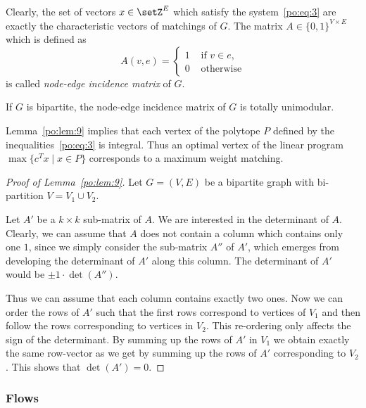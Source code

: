 Clearly, the set of vectors $x \in \setZ^E$ which satisfy the
system~\eqref{po:eq:3} are exactly the characteristic vectors of
matchings of $G$. The matrix $A \in \{0,1\}^{V\times E}$ which is defined as 
\begin{displaymath}
  \label{po:sec:bipartite-matching}
  A(v,e) = 
  \begin{cases}
    1 & \text{ if } v \in e,\\
    0 & \text{ otherwise}
  \end{cases}
\end{displaymath}
is called \emph{node-edge incidence matrix} of $G$. 

\begin{lemma}
  \label{po:lem:9}
  If $G$ is bipartite, the node-edge incidence matrix of $G$ is
  totally unimodular. 
\end{lemma}

Lemma~\ref{po:lem:9} implies that each vertex of the polytope $P$ defined
by the inequalities~\eqref{po:eq:3} is integral. Thus an optimal vertex
of the linear program $\max\{c^Tx \mid x \in P\}$ corresponds to a
maximum weight matching. 



\begin{proof}[Proof of Lemma~\ref{po:lem:9}]
  Let  $G = (V,E)$ be a bipartite graph with bi-partition $V=V_1\cup V_2$. 
  
  Let $A'$ be a $k\times k$ sub-matrix of $A$. We are interested in the
  determinant of $A$. Clearly, we can assume that $A$ does not contain
  a column which contains only one $1$, since we simply consider the
  sub-matrix $A''$ of $A'$, which emerges from developing the
  determinant of $A'$ along this column. The determinant of $A'$ would
  be $\pm1\cdot \det(A'')$.
  
  Thus we can assume that each column contains exactly two ones. Now
  we can order the rows of $A'$ such that the first rows correspond to
  vertices of $V_1$ and then follow the rows corresponding to vertices
  in $V_2$. This re-ordering only affects the sign of the
  determinant. By summing up the rows of $A'$ in $V_1$ we obtain
  exactly the same row-vector as we get by summing up the rows of $A'$
  corresponding to $V_2$. This shows that $\det(A')=0$. 
\end{proof}



\subsubsection{Flows}

